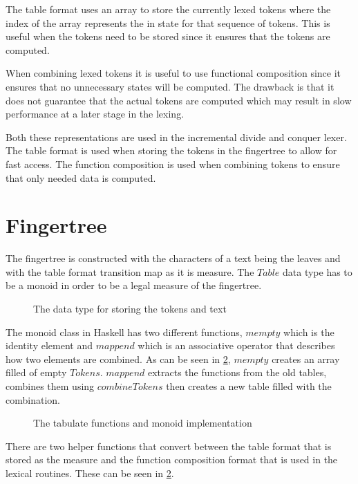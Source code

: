 The table format uses an array to store the currently lexed tokens where the
index of the array represents the in state for that sequence of tokens. This is
useful when the tokens need to be stored since it ensures that the tokens are
computed.

When combining lexed tokens it is useful to use functional composition since it
ensures that no unnecessary states will be computed. The drawback is that it
does not guarantee that the actual tokens are computed which may result in slow
performance at a later stage in the lexing.

Both these representations are used in the incremental divide and conquer lexer.
The table format is used when storing the tokens in the fingertree to allow for
fast access. The function composition is used when combining tokens to ensure
that only needed data is computed.

\section{Fingertree}
The fingertree is constructed with the characters of a text being the leaves and
with the table format transition map as it is measure. The $Table$ data type has
to be a monoid in order to be a legal measure of the fingertree.

\begin{figure}[h!]
  
  \caption{The data type for storing the tokens and text \label{fig:fingertreedt}}
\end{figure}

The monoid class in Haskell has two different functions, $mempty$ which is the
identity element and $mappend$ which is an associative operator that describes
how two elements are combined. As can be seen in \cref{fig:tablemonoid},
$mempty$ creates an array filled of empty $Tokens$. $mappend$ extracts the
functions from the old tables, combines them using $combineTokens$ then creates
a new table filled with the combination.

\begin{figure}[h!]
  
  \caption{The tabulate functions and monoid implementation \label{fig:tablemonoid}}
\end{figure}

There are two helper functions that convert between the table format that is
stored as the measure and the function composition format that is used in the
lexical routines. These can be seen in \cref{fig:tablemonoid}.


